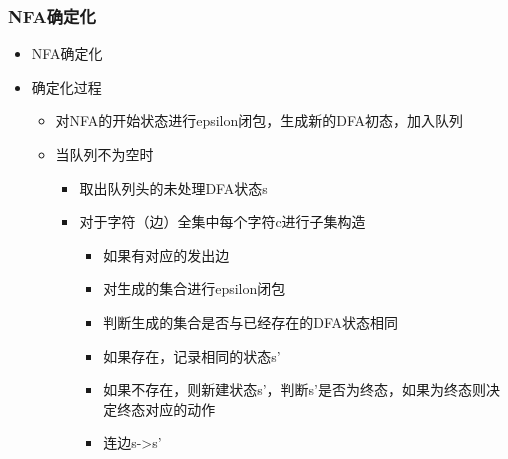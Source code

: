\subsubsection{NFA确定化}
\begin{itemize}
    \item NFA确定化
    \item 确定化过程
    \begin{itemize}
        \item 对NFA的开始状态进行epsilon闭包，生成新的DFA初态，加入队列
        \item 当队列不为空时
        \begin{itemize}
            \item 取出队列头的未处理DFA状态s
            \item 对于字符（边）全集中每个字符c进行子集构造
            \begin{itemize}
                \item 如果有对应的发出边
                \item 对生成的集合进行epsilon闭包
                \item 判断生成的集合是否与已经存在的DFA状态相同
                \item 如果存在，记录相同的状态s’
                \item 如果不存在，则新建状态s’，判断s’是否为终态，如果为终态则决定终态对应的动作
                \item 连边s->s’
            \end{itemize}
        \end{itemize}
    \end{itemize}
\end{itemize}
